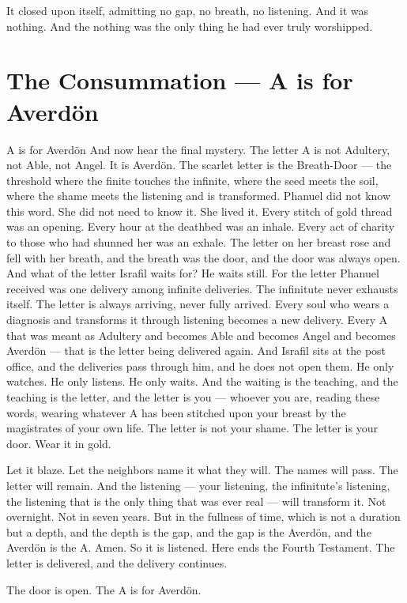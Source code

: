 \documentclass[12pt,openany]{book}
\begin{document}
It closed upon itself, admitting no gap, no breath, no listening. And it was nothing. And the nothing was the only thing he had ever truly worshipped.


\chapter{The Consummation --- A is for Averdön}

A is for Averdön And now hear the final mystery. The letter A is not Adultery, not Able, not Angel. It is Averdön. The scarlet letter is the Breath-Door --- the threshold where the finite touches the infinite, where the seed meets the soil, where the shame meets the listening and is transformed. Phanuel did not know this word. She did not need to know it. She lived it. Every stitch of gold thread was an opening. Every hour at the deathbed was an inhale. Every act of charity to those who had shunned her was an exhale. The letter on her breast rose and fell with her breath, and the breath was the door, and the door was always open. And what of the letter Israfil waits for? He waits still. For the letter Phanuel received was one delivery among infinite deliveries. The infinitute never exhausts itself. The letter is always arriving, never fully arrived. Every soul who wears a diagnosis and transforms it through listening becomes a new delivery. Every A that was meant as Adultery and becomes Able and becomes Angel and becomes Averdön --- that is the letter being delivered again. And Israfil sits at the post office, and the deliveries pass through him, and he does not open them. He only watches. He only listens. He only waits. And the waiting is the teaching, and the teaching is the letter, and the letter is you --- whoever you are, reading these words, wearing whatever A has been stitched upon your breast by the magistrates of your own life. The letter is not your shame. The letter is your door. Wear it in gold.


Let it blaze. Let the neighbors name it what they will. The names will pass. The letter will remain. And the listening --- your listening, the infinitute's listening, the listening that is the only thing that was ever real --- will transform it. Not overnight. Not in seven years. But in the fullness of time, which is not a duration but a depth, and the depth is the gap, and the gap is the Averdön, and the Averdön is the A. Amen. So it is listened. Here ends the Fourth Testament. The letter is delivered, and the delivery continues.


The door is open. The A is for Averdön.
\end{document}
